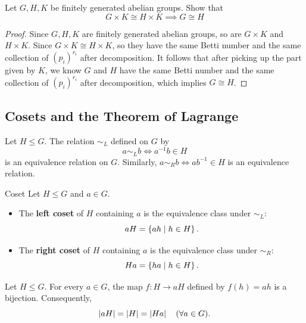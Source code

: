 \documentclass[12pt,a4paper]{article}
\begin{document}
    \begin{ex}
        Let $G,H,K$ be finitely generated abelian groups. Show that
        \[
            G\times K\cong H\times K\implies G\cong H
        \]
    \end{ex}
    \begin{proof}
        Since $G,H,K$ are finitely generated abelian groups, so are $G\times K$ and $H\times K$. Since $G\times K\cong H\times K$, so they have the same Betti number and the same collection of $(p_i)^{r_i}$ after decomposition. It follows that after picking up the part given by $K$, we know $G$ and $H$ have the same Betti number and the same collection of $(p_i)^{r_i}$ after decomposition, which implies $G\cong H$.
    \end{proof}

    \subsection{Cosets and the Theorem of Lagrange}

    \begin{thm}
        Let $H \le G$. The relation $\sim_L$ defined on $G$ by
        \[
            a \sim_L b \iff a^{-1}b \in H
        \]
        is an equivalence relation on $G$. Similarly, $a \sim_R b \iff ab^{-1} \in H$ is an equivalence relation.
    \end{thm}
    \bigskip

    \begin{defi}{Coset}
        Let $H \le G$ and $a \in G$.
        \begin{itemize}
            \item The \textbf{left coset} of $H$ containing $a$ is the equivalence class under $\sim_L$:
            \[
                aH = \left\{ ah \mid h \in H \right\}.
            \]
            \item The \textbf{right coset} of $H$ containing $a$ is the equivalence class under $\sim_R$:
            \[
                Ha = \left\{ ha \mid h \in H \right\}.
            \]
        \end{itemize}
    \end{defi}
    \bigskip

    \begin{thm}
        Let $H \le G$. For every $a \in G$, the map $f \colon H \to aH$ defined by $f(h) = ah$ is a bijection. Consequently,
        \[
            \left\lvert aH \right\rvert = \left\lvert H \right\rvert = \left\lvert Ha \right\rvert \quad (\forall a \in G).
        \]
    \end{thm}
    \bigskip
\end{document}
